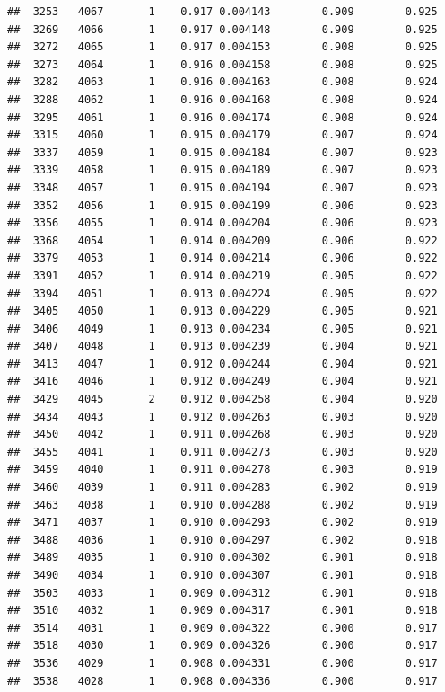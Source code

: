 \documentclass[
]{book}
\begin{document}
\begin{verbatim}
##  3253   4067       1    0.917 0.004143        0.909        0.925
##  3269   4066       1    0.917 0.004148        0.909        0.925
##  3272   4065       1    0.917 0.004153        0.908        0.925
##  3273   4064       1    0.916 0.004158        0.908        0.925
##  3282   4063       1    0.916 0.004163        0.908        0.924
##  3288   4062       1    0.916 0.004168        0.908        0.924
##  3295   4061       1    0.916 0.004174        0.908        0.924
##  3315   4060       1    0.915 0.004179        0.907        0.924
##  3337   4059       1    0.915 0.004184        0.907        0.923
##  3339   4058       1    0.915 0.004189        0.907        0.923
##  3348   4057       1    0.915 0.004194        0.907        0.923
##  3352   4056       1    0.915 0.004199        0.906        0.923
##  3356   4055       1    0.914 0.004204        0.906        0.923
##  3368   4054       1    0.914 0.004209        0.906        0.922
##  3379   4053       1    0.914 0.004214        0.906        0.922
##  3391   4052       1    0.914 0.004219        0.905        0.922
##  3394   4051       1    0.913 0.004224        0.905        0.922
##  3405   4050       1    0.913 0.004229        0.905        0.921
##  3406   4049       1    0.913 0.004234        0.905        0.921
##  3407   4048       1    0.913 0.004239        0.904        0.921
##  3413   4047       1    0.912 0.004244        0.904        0.921
##  3416   4046       1    0.912 0.004249        0.904        0.921
##  3429   4045       2    0.912 0.004258        0.904        0.920
##  3434   4043       1    0.912 0.004263        0.903        0.920
##  3450   4042       1    0.911 0.004268        0.903        0.920
##  3455   4041       1    0.911 0.004273        0.903        0.920
##  3459   4040       1    0.911 0.004278        0.903        0.919
##  3460   4039       1    0.911 0.004283        0.902        0.919
##  3463   4038       1    0.910 0.004288        0.902        0.919
##  3471   4037       1    0.910 0.004293        0.902        0.919
##  3488   4036       1    0.910 0.004297        0.902        0.918
##  3489   4035       1    0.910 0.004302        0.901        0.918
##  3490   4034       1    0.910 0.004307        0.901        0.918
##  3503   4033       1    0.909 0.004312        0.901        0.918
##  3510   4032       1    0.909 0.004317        0.901        0.918
##  3514   4031       1    0.909 0.004322        0.900        0.917
##  3518   4030       1    0.909 0.004326        0.900        0.917
##  3536   4029       1    0.908 0.004331        0.900        0.917
##  3538   4028       1    0.908 0.004336        0.900        0.917

\end{verbatim}
\end{document}
